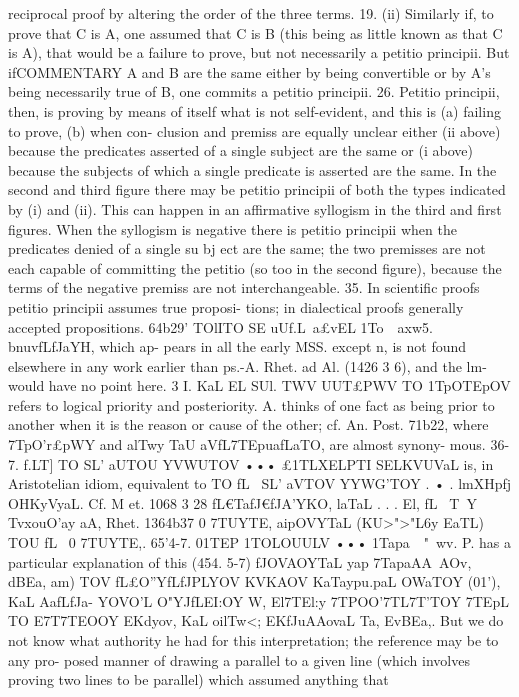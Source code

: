 {{reciprocal proof by altering the order of the three terms.
19. (ii) Similarly if, to prove that C is A, one assumed that
C is B (this being as little known as that C is A), that would be
a failure to prove, but not necessarily a petitio principii. But ifCOMMENTARY
A and B are the same either by being convertible or by A's being
necessarily true of B, one commits a petitio principii.
26. Petitio principii, then, is proving by means of itself what
is not self-evident, and this is (a) failing to prove, (b) when con-
clusion and premiss are equally unclear either (ii above) because
the predicates asserted of a single subject are the same or (i above)
because the subjects of which a single predicate is asserted are the
same. In the second and third figure there may be petitio principii
of both the types indicated by (i) and (ii). This can happen in an
affirmative syllogism in the third and first figures. When the
syllogism is negative there is petitio principii when the predicates
denied of a single su bj ect are the same; the two premisses are not
each capable of committing the petitio (so too in the second figure),
because the terms of the negative premiss are not interchangeable.
35. In scientific proofs petitio principii assumes true proposi-
tions; in dialectical proofs generally accepted propositions.
64b29' TOlITO SE uUf.L~a£vEL 1To~~axw5. bnuvfLfJa{YH, which ap-
pears in all the early MSS. except n, is not found elsewhere in any
work earlier than ps.-A. Rhet. ad Al. (1426 3 6), and the lm- would
have no point here.
3 I. KaL EL SUl. TWV UUT£PWV TO 1TpOTEpOV refers to logical priority
and posteriority. A. thinks of one fact as being prior to another
when it is the reason or cause of the other; cf. An. Post. 71b22,
where 7TpO'r£pWY and alT{wy TaU aVfL7TEpuafLaTO, are almost synony-
mous.
36-7. f.LT] TO SL' aUTOU YVWUTOV ••• £1TLXELPTI SELKVUVaL is, in
Aristotelian idiom, equivalent to TO fL~ SL' aVTOV YYWG'TOY . • .
lmXHpfj OHKyVyaL. Cf. M et. 1068 3 28 fL€TafJ€fJA'Y}KO, laTaL . . . El, fL~
T~Y TvxouO'ay aA, Rhet. 1364b37 0 7TUYTE, aipOVYTaL (KU>">"L6y EaTL) TOU
fL~ 0
7TUYTE,.
65'4-7. 01TEP 1TOLOUULV ••• 1Tapa~~"~wv. P. has a particular
explanation of this (454. 5-7) fJOVAOYTaL yap 7TapaAA~AOv, dBE{a,
am) TOV fL£O''Y}fLfJPLYOV KVKAOV KaTaypu.paL OWaTOY (01'), KaL AafLfJa-
YOVO'L O"YJfLEI:OY W, El7TEl:y 7TPOO'7TL7T'TOY 7TEpL TO E7T{7TEOOY EKdyov, KaL
oilTw<; EKfJuAAovaL Ta, EvBE{a,. But we do not know what authority
he had for this interpretation; the reference may be to any pro-
posed manner of drawing a parallel to a given line (which involves
proving two lines to be parallel) which assumed anything that
}}}}}

